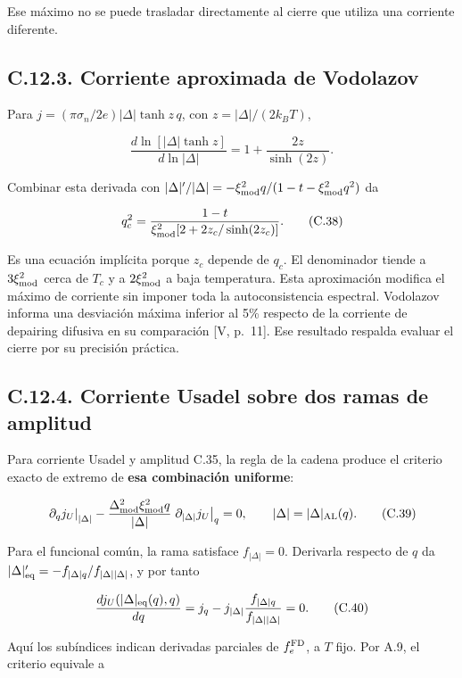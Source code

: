 \documentclass[
  spanish,
  10pt,
  a4paper,
]{article}
\begin{document}
Ese máximo no se puede trasladar directamente al cierre que utiliza una
corriente diferente.

\subsection{C.12.3. Corriente aproximada de
Vodolazov}\label{c.12.3.-corriente-aproximada-de-vodolazov}

Para \(j=(\pi\sigma_n/2e)|\Delta|\tanh z\,q\), con
\(z=|\Delta|/(2k_BT)\),

\[
\frac{d\ln[|\Delta|\tanh z]}{d\ln|\Delta|}
=1+\frac{2z}{\sinh(2z)}.
\tag{C.37}
\]

Combinar esta derivada con
\(|\Delta|' /|\Delta|=-\xi_{\rm mod}^2q/(1-t-\xi_{\rm mod}^2q^2)\) da

\[
q_c^2=\frac{1-t}{\xi_{\rm mod}^2
[2+2z_c/\sinh(2z_c)]}.
\tag{C.38}
\]

Es una ecuación implícita porque \(z_c\) depende de \(q_c\). El
denominador tiende a \(3\xi_{\rm mod}^2\) cerca de \(T_c\) y a
\(2\xi_{\rm mod}^2\) a baja temperatura. Esta aproximación modifica el
máximo de corriente sin imponer toda la autoconsistencia espectral.
Vodolazov informa una desviación máxima inferior al 5\% respecto de la
corriente de depairing difusiva en su comparación {[}V, p.~11{]}. Ese
resultado respalda evaluar el cierre por su precisión práctica.

\subsection{C.12.4. Corriente Usadel sobre dos ramas de
amplitud}\label{c.12.4.-corriente-usadel-sobre-dos-ramas-de-amplitud}

Para corriente Usadel y amplitud C.35, la regla de la cadena produce el
criterio exacto de extremo de \textbf{esa combinación uniforme}:

\[
\left.\partial_qj_U\right|_{|\Delta|}
-\frac{\Delta_{\rm mod}^2\xi_{\rm mod}^2q}{|\Delta|}
\left.\partial_{|\Delta|}j_U\right|_q=0,
\qquad |\Delta|=|\Delta|_{\rm AL}(q).
\tag{C.39}
\]

Para el funcional común, la rama satisface \(f_{|\Delta|}=0\). Derivarla
respecto de \(q\) da
\(|\Delta|'_{\rm eq}=-f_{|\Delta|q}/f_{|\Delta||\Delta|}\), y por tanto

\[
\frac{d j_U(|\Delta|_{\rm eq}(q),q)}{dq}
=j_q-j_{|\Delta|}\frac{f_{|\Delta|q}}{f_{|\Delta||\Delta|}}=0.
\tag{C.40}
\]

Aquí los subíndices indican derivadas parciales de \(f_e^{\rm FD}\), a
\(T\) fijo. Por A.9, el criterio equivale a
\end{document}
